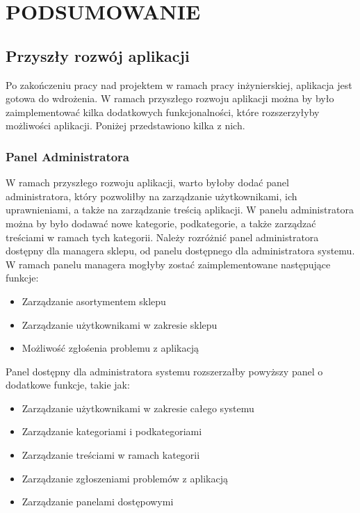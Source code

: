 \chapter{PODSUMOWANIE}
\label{chapter:podsumowanie}

\section{Przyszły rozwój aplikacji}

Po zakończeniu pracy nad projektem w ramach pracy inżynierskiej, aplikacja jest gotowa do wdrożenia. W ramach przyszłego rozwoju aplikacji można by było zaimplementować kilka dodatkowych funkcjonalności, które rozszerzyłyby możliwości aplikacji. Poniżej przedstawiono kilka z nich.

\subsection{Panel Administratora}
W ramach przyszłego rozwoju aplikacji, warto byłoby dodać panel administratora, który pozwoliłby na zarządzanie użytkownikami, ich uprawnieniami, a także na zarządzanie treścią aplikacji. W panelu administratora można by było dodawać nowe kategorie, podkategorie, a także zarządzać treściami w ramach tych kategorii.
Należy rozróżnić panel administratora dostępny dla managera sklepu, od panelu dostępnego dla administratora systemu. W ramach panelu managera mogłyby zostać zaimplementowane następujące funkcje:
\begin{itemize}
    \item Zarządzanie asortymentem sklepu
    \item Zarządzanie użytkownikami w zakresie sklepu
    \item Możliwość zgłośenia problemu z aplikacją
\end{itemize}

Panel dostępny dla administratora systemu rozszerzałby powyższy panel o dodatkowe funkcje, takie jak:
\begin{itemize}
    \item Zarządzanie użytkownikami w zakresie całego systemu
    \item Zarządzanie kategoriami i podkategoriami
    \item Zarządzanie treściami w ramach kategorii
    \item Zarządzanie zgłoszeniami problemów z aplikacją
    \item Zarządzanie panelami dostępowymi
\end{itemize}